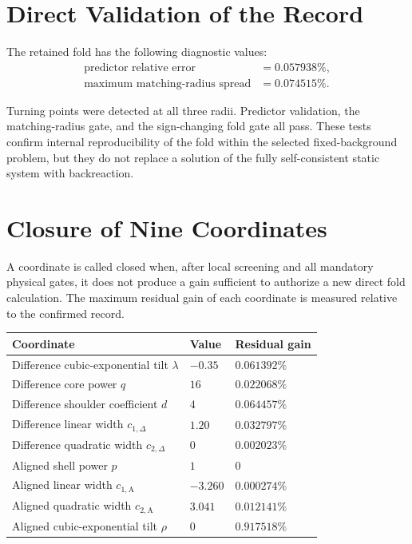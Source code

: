 \documentclass[11pt,a4paper]{article}
\begin{document}
\section{Direct Validation of the Record}

The retained fold has the following diagnostic values:
\begin{align}
\text{predictor relative error} &= 0.057938\%, \\
\text{maximum matching-radius spread} &= 0.074515\%.
\end{align}

Turning points were detected at all three radii. Predictor validation, the matching-radius gate, and the sign-changing fold gate all pass. These tests confirm internal reproducibility of the fold within the selected fixed-background problem, but they do not replace a solution of the fully self-consistent static system with backreaction.

\section{Closure of Nine Coordinates}

A coordinate is called closed when, after local screening and all mandatory physical gates, it does not produce a gain sufficient to authorize a new direct fold calculation. The maximum residual gain of each coordinate is measured relative to the confirmed record.

\begin{center}
\small
\begin{tabular}{@{}p{}p{}p{}@{}}
\textbf{Coordinate} & \textbf{Value} & \textbf{Residual gain} \\
\hline
Difference cubic-exponential tilt $\lambda$ & $-0.35$ & $0.061392\%$ \\
Difference core power $q$ & $16$ & $0.022068\%$ \\
Difference shoulder coefficient $d$ & $4$ & $0.064457\%$ \\
Difference linear width $c_{1,\Delta}$ & $1.20$ & $0.032797\%$ \\
Difference quadratic width $c_{2,\Delta}$ & $0$ & $0.002023\%$ \\
Aligned shell power $p$ & $1$ & $0$ \\
Aligned linear width $c_{1,\mathrm{A}}$ & $-3.260$ & $0.000274\%$ \\
Aligned quadratic width $c_{2,\mathrm{A}}$ & $3.041$ & $0.012141\%$ \\
Aligned cubic-exponential tilt $\rho$ & $0$ & $0.917518\%$ \\
\end{tabular}
\end{center}
\end{document}
